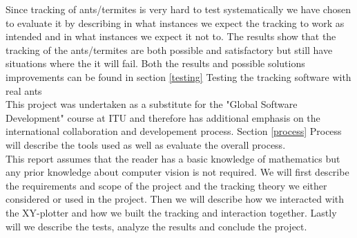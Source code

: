 Since tracking of ants/termites is very hard to test systematically we have chosen to evaluate it by describing in what instances we expect the tracking to work as intended and in what instances we expect it not to. The results show that the tracking of the ants/termites are both possible and satisfactory but still have situations where the it will fail. Both the results and possible solutions improvements can be found in section \ref{testing} Testing the tracking software with real ants \\

This project was undertaken as a substitute for the "Global Software Development" course at ITU and therefore has additional emphasis on the international collaboration and developement process. Section \ref{process} Process will describe the tools used as well as evaluate the overall process. \\ 

This report assumes that the reader has a basic knowledge of mathematics but any prior knowledge about computer vision is not required. We will first describe the requirements and scope of the project and the tracking theory we either considered or used in the project. Then we will describe how we interacted with the XY-plotter and how we built the tracking and interaction together. Lastly will we describe the tests, analyze the results and conclude the project.



